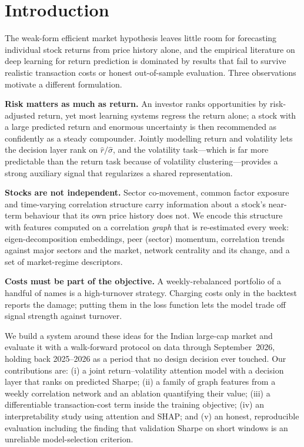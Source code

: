 \documentclass[conference]{IEEEtran}
\begin{document}
\section{Introduction}
The weak-form efficient market hypothesis leaves little room for forecasting individual stock returns from price history alone, and the empirical literature on deep learning for return prediction is dominated by results that fail to survive realistic transaction costs or honest out-of-sample evaluation. Three observations motivate a different formulation.

\textbf{Risk matters as much as return.} An investor ranks opportunities by risk-adjusted return, yet most learning systems regress the return alone; a stock with a large predicted return and enormous uncertainty is then recommended as confidently as a steady compounder. Jointly modelling return and volatility lets the decision layer rank on $\hat{r}/\hat{\sigma}$, and the volatility task---which is far more predictable than the return task because of volatility clustering---provides a strong auxiliary signal that regularizes a shared representation.

\textbf{Stocks are not independent.} Sector co-movement, common factor exposure and time-varying correlation structure carry information about a stock's near-term behaviour that its own price history does not. We encode this structure with features computed on a correlation \emph{graph} that is re-estimated every week: eigen-decomposition embeddings, peer (sector) momentum, correlation trends against major sectors and the market, network centrality and its change, and a set of market-regime descriptors.

\textbf{Costs must be part of the objective.} A weekly-rebalanced portfolio of a handful of names is a high-turnover strategy. Charging costs only in the backtest reports the damage; putting them in the loss function lets the model trade off signal strength against turnover.

We build a system around these ideas for the Indian large-cap market and evaluate it with a walk-forward protocol on data through September~2026, holding back 2025--2026 as a period that no design decision ever touched. Our contributions are: (i) a joint return--volatility attention model with a decision layer that ranks on predicted Sharpe; (ii) a family of graph features from a weekly correlation network and an ablation quantifying their value; (iii) a differentiable transaction-cost term inside the training objective; (iv) an interpretability study using attention and SHAP; and (v) an honest, reproducible evaluation including the finding that validation Sharpe on short windows is an unreliable model-selection criterion.
\end{document}
